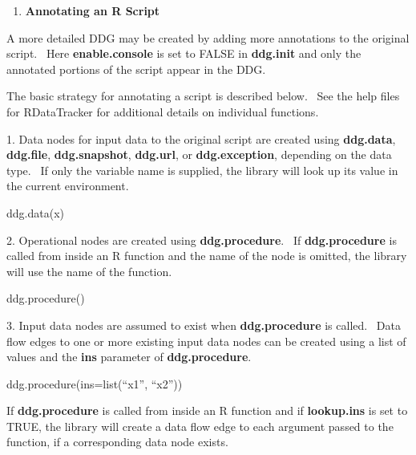 \documentclass[letterpaper]{article}
\newcounter{saveenum}
\newcommand\liststyleWWNumxv{%
\renewcommand\theenumi{\arabic{enumi}}
\renewcommand\theenumii{\alph{enumii}}
\renewcommand\theenumiii{\alph{enumii}.\roman{enumiii}}
\renewcommand\theenumiv{\alph{enumii}.\roman{enumiii}.\arabic{enumiv}}
\renewcommand\labelenumi{\theenumi.}
\renewcommand\labelenumii{\theenumii.}
\renewcommand\labelenumiii{\theenumiii.}
\renewcommand\labelenumiv{\theenumiv.}
}
\begin{document}
\bigskip

\liststyleWWNumxv
\setcounter{saveenum}{\value{enumi}}
\begin{enumerate}
\setcounter{enumi}{\value{saveenum}}
\item \textbf{Annotating an R Script}
\end{enumerate}

\bigskip

A more detailed DDG may be created by adding more annotations to the original script. \ Here \textbf{enable.console} is set to FALSE in \textbf{ddg.init} and only the annotated portions of the script appear in the DDG.


\bigskip

The basic strategy for annotating a script is described below. \ See the help files for RDataTracker for additional details on individual functions.


\bigskip

1. Data nodes for input data to the original script are created using \textbf{ddg.data}, \textbf{ddg.file}, \textbf{ddg.snapshot}, \textbf{ddg.url}, or \textbf{ddg.exception}, depending on the data type. \ If only the variable name is supplied, the library will look up its value in the current environment.


\bigskip

\textcolor[rgb]{0.21176471,0.37254903,0.5686275}{ddg.data(x)}


\bigskip

2. Operational nodes are created using \textbf{ddg.procedure}. \ If \textbf{ddg.procedure} is called from inside an R function and the name of the node is omitted, the library will use the name of the function.


\bigskip

\textcolor[rgb]{0.21176471,0.37254903,0.5686275}{ddg.procedure()}


\bigskip

3. Input data nodes are assumed to exist when \textbf{ddg.procedure} is called. \ Data flow edges to one or more existing input data nodes can be created using a list of values and the \textbf{ins} parameter of \textbf{ddg.procedure}. \ 


\bigskip

\textcolor[rgb]{0.21176471,0.37254903,0.5686275}{ddg.procedure(ins=list(``x1'', ``x2''))}


\bigskip

If \textbf{ddg.procedure} is called from inside an R function and if \textbf{lookup.ins} is set to TRUE, the library will create a data flow edge to each argument passed to the function, if a corresponding data node exists.
\end{document}
